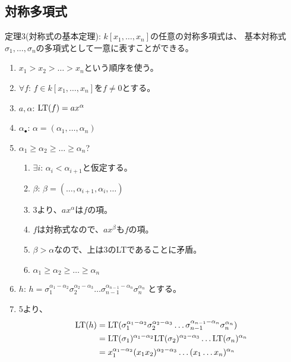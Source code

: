 \label{sec:有限群の不変式論}

\subsection{対称多項式}
\label{sub:対称多項式}


\begin{framed}
  定理3(対称式の基本定理):
  $k[x_1,\dots,x_n]$の任意の対称多項式は、
  基本対称式$\sigma_1,\dots,\sigma_n$の多項式として一意に表すことができる。
\end{framed}
\begin{myproof}
  \begin{enumerate}
    \item $x_1>x_2>\dots>x_n$という順序を使う。
    \item $\forall f$: $f\in k[x_1,\dots,x_n]$を$f\neq 0$とする。
    \item
    $a,\alpha$: ${\rm LT}(f) = ax^\alpha$
    \item
    $\alpha_\bullet$: $\alpha = (\alpha_1,\dots,\alpha_n)$
    \item $\alpha_1\ge \alpha_2 \ge \dots \ge \alpha_n$?
    \begin{enumerate}
      \item
      $\exists i$: $\alpha_i < \alpha_{i+1}$と仮定する。
      \item
      $\beta$: $\beta = (\dots,\alpha_{i+1},\alpha_i,\dots)$
      \item
      3より、$ax^\alpha$は$f$の項。
      \item
      $f$は対称式なので、$ax^\beta$も$f$の項。
      \item
      $\beta > \alpha$なので、上は3のLTであることに矛盾。
      \item
      $\alpha_1\ge \alpha_2 \ge \dots \ge \alpha_n$
    \end{enumerate}
    \item $h$: $h = \sigma_1^{\alpha_1-\alpha_2}\sigma_2^{\alpha_2-\alpha_3}\dots \sigma_{n-1}^{\alpha_{n-1}-\alpha_n}\sigma_n^{\alpha_n}$
    とする。
    \item
    5より、
    \begin{align}
      \LT(h)
      &=
      \LT(\sigma_1^{\alpha_1-\alpha_2}\sigma_2^{\alpha_2-\alpha_3}\dots \sigma_{n-1}^{\alpha_{n-1}-\alpha_n}\sigma_n^{\alpha_n})\\
      &=
      \LT(\sigma_1)^{\alpha_1-\alpha_2}\LT(\sigma_2)^{\alpha_2-\alpha_3} \dots \LT(\sigma_n)^{\alpha_n}\\
      &=
      x_1^{\alpha_1-\alpha_2} (x_1x_2)^{\alpha_2-\alpha_3}\dots (x_1 \dots x_n)^{\alpha_n}\\

\end{align}
\end{enumerate}
\end{myproof}
